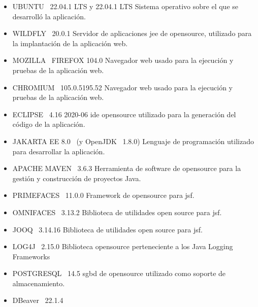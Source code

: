 \begin{itemize}
 \item UBUNTU~\cite{Ubuntu} 22.04.1 LTS y 22.04.1 LTS\newline
 Sistema operativo sobre el que se desarrolló la aplicación.
 \item WILDFLY~ \cite{Wildfly} 20.0.1\newline
 Servidor de aplicaciones \acrshort{jee} de \gls{opensource}, utilizado para la implantación de la aplicación web.
 \item MOZILLA~\cite{Mozilla} FIREFOX 104.0\newline
 Navegador web usado para la ejecución y pruebas de la aplicación web.
  \item CHROMIUM~\cite{Chromium} 105.0.5195.52\newline
 Navegador web usado para la ejecución y pruebas de la aplicación web.
 \item ECLIPSE~\cite{EclipseIDE} 4.16 2020-06\newline
 \acrfull{ide} \gls{opensource} utilizado para la generación del código de la aplicación.
 \item JAKARTA EE 8.0~\cite{JakartaEE} (y OpenJDK~\cite{OpenJDK} 1.8.0)\newline
 Lenguaje de programación utilizado para desarrollar la aplicación.
 \item APACHE MAVEN~\cite{ApacheMaven} 3.6.3\newline
 Herramienta de software de \gls{opensource} para la gestión y construcción de proyectos Java.
 \item PRIMEFACES~\cite{Primefaces} 11.0.0\newline
 Framework de \gls{opensource} para \acrshort{jsf}.
 \item OMNIFACES~\cite{Omnifaces} 3.13.2\newline
 Biblioteca de utilidades open source para \acrshort{jsf}. 
 \item JOOQ~\cite{JooQ} 3.14.16\newline
 Biblioteca de utilidades open source para \acrshort{jsf}.  
 \item LOG4J~\cite{Log4j} 2.15.0\newline
 Biblioteca \gls{opensource} perteneciente a los Java Logging Frameworks 
 \item POSTGRESQL~\citep{Postgresql} 14.5\newline
 \acrshort{sgbd} de \gls{opensource} utilizado como soporte de almacenamiento.
 \item DBeaver~\cite{DBeaver} 22.1.4\newline

\end{itemize}
